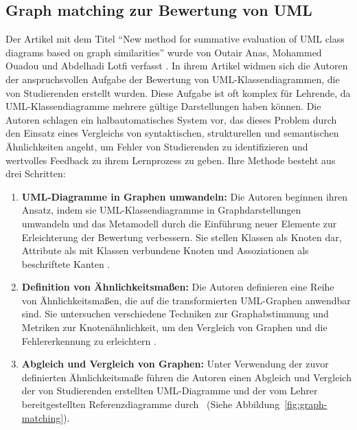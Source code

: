 \subsection{Graph matching zur Bewertung von UML}

Der Artikel mit dem Titel ``New method for summative evaluation of UML class diagrams based on graph similarities'' wurde von Outair Anas, Mohammed Ouadou und Abdelhadi Lotfi verfasst \cite{anas2021new}. In ihrem Artikel widmen sich die Autoren der anspruchsvollen Aufgabe der Bewertung von UML-Klassendiagrammen, die von Studierenden erstellt wurden. Diese Aufgabe ist oft komplex für Lehrende, da UML-Klassendiagramme mehrere gültige Darstellungen haben können. Die Autoren schlagen ein halbautomatisches System vor, das dieses Problem durch den Einsatz eines Vergleichs von syntaktischen, strukturellen und semantischen Ähnlichkeiten angeht, um Fehler von Studierenden zu identifizieren und wertvolles Feedback zu ihrem Lernprozess zu geben. Ihre Methode besteht aus drei Schritten: 

\begin{enumerate}
    \item \textbf{UML-Diagramme in Graphen umwandeln:} Die Autoren beginnen ihren Ansatz, indem sie UML-Klassendiagramme in Graphdarstellungen umwandeln und das Metamodell durch die Einführung neuer Elemente zur Erleichterung der Bewertung verbessern. Sie stellen Klassen als Knoten dar, Attribute als mit Klassen verbundene Knoten und Assoziationen als beschriftete Kanten \cite{auxepaules2015diagram}.

    \item \textbf{Definition von Ähnlichkeitsmaßen:} Die Autoren definieren eine Reihe von Ähnlichkeitsmaßen, die auf die transformierten UML-Graphen anwendbar sind. Sie untersuchen verschiedene Techniken zur Graphabstimmung und Metriken zur Knotenähnlichkeit, um den Vergleich von Graphen und die Fehlererkennung zu erleichtern \cite{fauzan2018class}.

    \item \textbf{Abgleich und Vergleich von Graphen:} Unter Verwendung der zuvor definierten Ähnlichkeitsmaße führen die Autoren einen Abgleich und Vergleich der von Studierenden erstellten UML-Diagramme und der vom Lehrer bereitgestellten Referenzdiagramme durch~\cite{outair2017towards} (Siehe Abbildung~\ref{fig:graph-matching}).
\end{enumerate}


